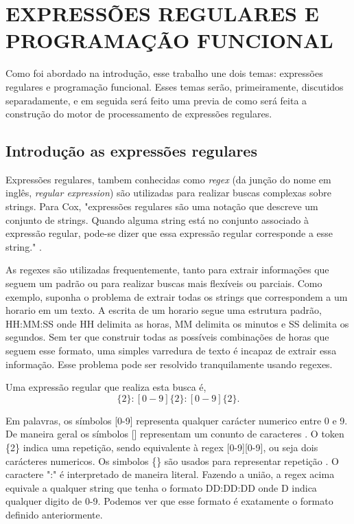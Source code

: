\section{EXPRESSÕES REGULARES E PROGRAMAÇÃO FUNCIONAL}
Como foi abordado na introdução, esse trabalho une dois temas: expressões regulares e programação funcional.
Esses temas serão, primeiramente, discutidos separadamente, e em seguida será feito uma previa de como será feita a construção do motor de processamento de expressões regulares.

\subsection{Introdução as expressões regulares}

Expressões regulares, tambem conhecidas como \emph{regex} (da junção do nome em inglês, \emph{regular expression}) são utilizadas para realizar buscas complexas sobre strings.
Para Cox,
"expressões regulares são uma notação que descreve um conjunto de strings.
Quando alguma string está no conjunto associado à expressão regular, pode-se dizer que essa expressão regular corresponde a esse string." \cite{cox}.

As regexes são utilizadas frequentemente, tanto para extrair informações que seguem um padrão ou para realizar buscas mais flexíveis ou parciais.
Como exemplo, suponha o problema de extrair todas os strings que correspondem a um horario em um texto.
A escrita de um horario segue uma estrutura padrão, HH:MM:SS onde HH delimita as horas, MM delimita os minutos e SS delimita os segundos.
Sem ter que construir todas as possíveis combinações de horas que seguem esse formato, uma simples varredura de texto é incapaz de extrair essa informação.
Esse problema pode ser resolvido tranquilamente usando regexes.

Uma expressão regular que realiza esta busca é,
\begin{equation}
  [0-9]\{2\}:[0-9]\{2\}:[0-9]\{2\} .
\end{equation}

Em palavras, os símbolos [0-9] representa qualquer carácter numerico entre 0 e 9.
De maneira geral os símbolos [] representam um conunto de caracteres \cite{python-re}.
O token \{2\} indica uma repetição, sendo equivalente à regex [0-9][0-9], ou seja dois carácteres numericos.
Os simbolos \{\} são usados para representar repetição \cite{python-re}.
O caractere ":" é interpretado de maneira literal.
Fazendo a união, a regex acima equivale a qualquer string que tenha o formato DD:DD:DD onde D indica qualquer digito de 0-9.
Podemos ver que esse formato é exatamente o formato definido anteriormente.

